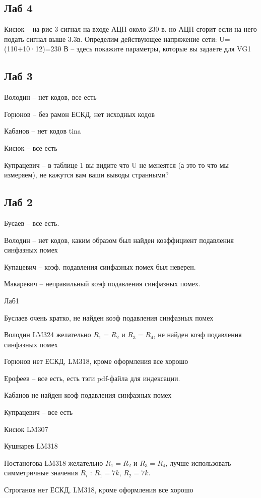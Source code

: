 \documentclass[a4paper,11pt]{article}
\begin{document}
\subsection*{Лаб 4}
Кисюк -- на рис 3 сигнал на входе АЦП около 230 в. но АЦП сгорит если на него подать сигнал выше 3.3в.  Определим действующее напряжение сети:
U=(110+10·12)=230 В  -- здесь покажите параметры, которые вы задаете для VG1

\newpage
\subsection*{Лаб 3}

Володин -- нет кодов, все есть 

Горюнов -- без рамон ЕСКД, нет исходных кодов

Кабанов -- нет кодов tina

Кисюк -- все есть

Купрацевич -- в таблице 1 вы видите что U не менеятся (а это то что мы измеряем), не кажутся вам ваши выводы странными? 

\newpage
\subsection*{Лаб 2}

Бусаев -- все есть.

Володин -- нет кодов, каким образом был найден коэффициент подавления синфазных помех

Купацевич -- коэф. подавления синфазных помех был неверен.

Макаревич -- неправильный коэф подавления синфазных помех.

\newpage
Лаб1 

Буслаев  очень кратко, не найден коэф подавления синфазных помех

Володин LM324  желательно $R_1=R_2$ и $R_3=R_4$, не найден коэф подавления синфазных помех

Горюнов  нет ЕСКД, LM318, кроме оформления все хорошо

Ерофеев -- все есть, есть тэги pdf-файла для индексации.

Кабанов  не найден коэф подавления синфазных помех

Купрацевич -- все есть

Кисюк LM307

Кушнарев LM318

Постаногова LM318 желательно $R_1=R_2$ и $R_3=R_4$, лучше использовать симметричные значения $R_i$ : $R_1=7k$, $R_2=7k$. 

Строганов нет ЕСКД, LM318, кроме оформления все хорошо
\end{document}
